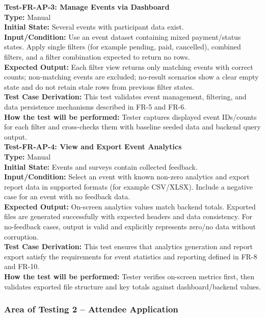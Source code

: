 \documentclass[12pt, titlepage]{article}
\begin{document}
\noindent\textbf{Test-FR-AP-3: Manage Events via Dashboard}\\
\textbf{Type:} Manual\\
\textbf{Initial State:} Several events with participant data exist.\\
\textbf{Input/Condition:} Use an event dataset containing mixed payment/status states. Apply single filters (for example pending, paid, cancelled), combined filters, and a filter combination expected to return no rows.\\
\textbf{Expected Output:} Each filter view returns only matching events with correct counts; non-matching events are excluded; no-result scenarios show a clear empty state and do not retain stale rows from previous filter states.\\
\textbf{Test Case Derivation:} This test validates event management, filtering, and data persistence mechanisms described in FR-5 and FR-6.\\
\textbf{How the test will be performed:} Tester captures displayed event IDs/counts for each filter and cross-checks them with baseline seeded data and backend query output.\\[6pt]

\noindent\textbf{Test-FR-AP-4: View and Export Event Analytics}\\
\textbf{Type:} Manual\\
\textbf{Initial State:} Events and surveys contain collected feedback.\\
\textbf{Input/Condition:} Select an event with known non-zero analytics and export report data in supported formats (for example CSV/XLSX). Include a negative case for an event with no feedback data.\\
\textbf{Expected Output:} On-screen analytics values match backend totals. Exported files are generated successfully with expected headers and data consistency. For no-feedback cases, output is valid and explicitly represents zero/no data without corruption.\\
\textbf{Test Case Derivation:} This test ensures that analytics generation and report export satisfy the requirements for event statistics and reporting defined in FR-8 and FR-10.\\
\textbf{How the test will be performed:} Tester verifies on-screen metrics first, then validates exported file structure and key totals against dashboard/backend values.\\[12pt]

\subsubsection{Area of Testing 2 – Attendee Application}
\end{document}
